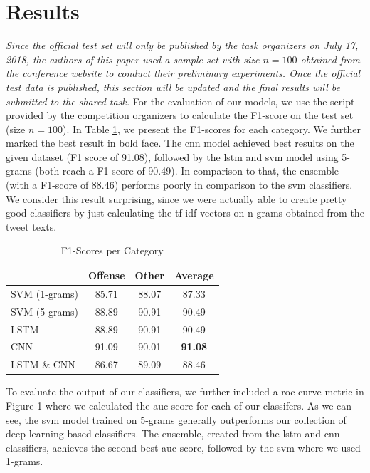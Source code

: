 \documentclass[11pt]{article}
\begin{document}
\section{Results}
\textit{Since the official test set will only be published by the task organizers on July 17, 2018, the authors of this paper used a sample set with size $n=100$ obtained from the conference website to conduct their preliminary experiments. Once the official test data is published, this section will be updated and the final results will be submitted to the shared task.} 
\newline
\newline
For the evaluation of our models, we use the script provided by the competition organizers to calculate the F1-score on the test set (size $n=100$). In Table \ref{tbl:results}, we present the F1-scores for each category. We further marked the best result in bold face. 
\newline
The \ac{cnn} model achieved best results on the given dataset (F1 score of 91.08), followed by the \ac{lstm} and \ac{svm} model using 5-grams (both reach a F1-score of 90.49). In comparison to that, the ensemble (with a F1-score of 88.46) performs poorly in comparison to the \ac{svm} classifiers. We consider this result surprising, since we were actually able to create pretty good classifiers by just calculating the \ac{tf-idf} vectors on n-grams obtained from the tweet texts. 
\newline 
\begin{table}[h]
\begin{center}
\begin{tabular}{l  c c c }
\toprule   &  Offense &  Other &   Average  \\ \midrule
SVM (1-grams) & 85.71 & 88.07 & 87.33  \\
SVM (5-grams) & 88.89 & 90.91 & 90.49  \\
LSTM & 88.89 & 90.91 & 90.49  \\
CNN & 91.09 & 90.01 & \textbf{91.08}  \\
LSTM \& CNN & 86.67 & 89.09 & 88.46  \\
\bottomrule
\end{tabular}
\end{center}
\caption{\label{tbl:results} F1-Scores per Category}
\end{table}
\newline
To evaluate the output of our classifiers, we further included a \ac{roc} curve metric in Figure 1 where we calculated the \ac{auc} score for each of our classifers. As we can see, the \ac{svm} model trained on 5-grams generally outperforms our collection of deep-learning based classifiers. The ensemble, created from the \ac{lstm} and \ac{cnn} classifiers, achieves the second-best \ac{auc} score, followed by the \ac{svm} where we used 1-grams.
\end{document}
